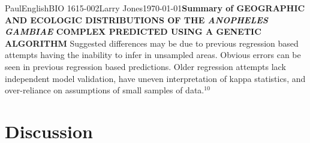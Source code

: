 \documentclass[10pt,twocolumn]{article}
\begin{document}
\begin{mla}{Paul}{English}{BIO 1615-002}{Larry Jones}{\today}{\textbf{Summary of GEOGRAPHIC AND ECOLOGIC DISTRIBUTIONS OF THE \textit{ANOPHELES GAMBIAE} COMPLEX PREDICTED USING A GENETIC ALGORITHM}}
Suggested differences may be due to previous regression based attempts having the inability to infer in unsampled areas. Obvious errors can be seen in previous regression based predictions. Older regression attempts lack independent model validation, have uneven interpretation of kappa statistics, and over-reliance on assumptions of small samples of data.$^{10}$

\section{Discussion}



\end{mla}
\end{document}
